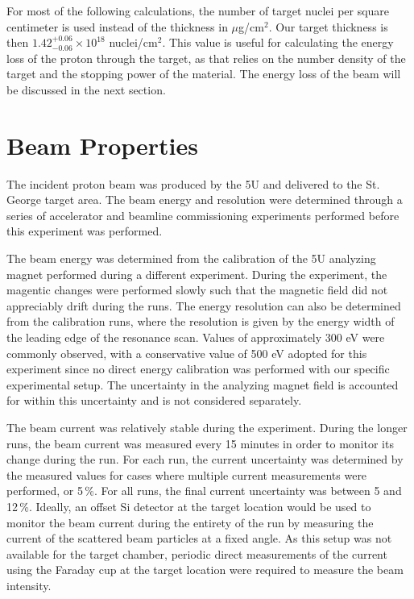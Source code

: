 For most of the following calculations, the number of target nuclei per
square centimeter is used instead of the thickness in $\mu$g/cm${}^{2}$. Our
target thickness is then $1.42^{+0.06}_{-0.06} \times 10^{18}$ nuclei/cm${}^{2}$.
This value is useful for calculating the energy loss of the proton
through the target, as that relies on the number density of the target
and the stopping power of the material. The energy loss of the beam will
be discussed in the next section.


\section{Beam Properties}
\label{sec:beam-properties}

The incident proton beam was produced by the 5U and delivered to the St.
George target area. The beam energy and resolution were determined
through a series of accelerator and beamline commissioning experiments
performed before this experiment was performed.


The beam energy was determined from the calibration of the 5U analyzing
magnet performed during a different experiment. During the experiment,
the magentic changes were performed slowly such that the magnetic field
did not appreciably drift during the runs. The energy resolution can
also be determined from the calibration runs, where the resolution is
given by the energy width of the leading edge of the resonance scan.
Values of approximately 300 eV were commonly observed, with a
conservative value of 500 eV adopted for this experiment since no direct
energy calibration was performed with our specific experimental setup.
The uncertainty in the analyzing magnet field is accounted for within
this uncertainty and is not considered separately.


The beam current was relatively stable during the experiment. During the
longer runs, the beam current was measured every 15 minutes in order to
monitor its change during the run. For each run, the current uncertainty
was determined by the measured values for cases where multiple current
measurements were performed, or 5\,\%. For all runs, the final current
uncertainty was between 5 and 12\,\%. Ideally, an offset Si detector at
the target location would be used to monitor the beam current during the
entirety of the run by measuring the current of the scattered beam
particles at a fixed angle. As this setup was not available for the
target chamber, periodic direct measurements of the current using the
Faraday cup at the target location were required to measure the beam
intensity.

